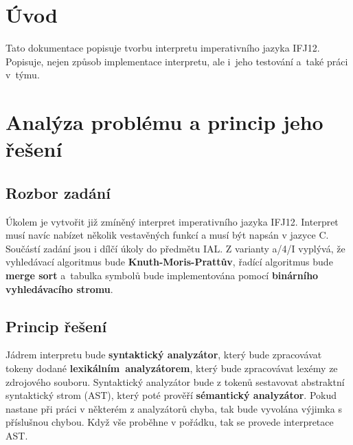 \documentclass[12pt,a4paper,titlepage,final]{article}
\begin{document}



\pagestyle{plain}
\setcounter{page}{1}
\tableofcontents

\newpage
\pagestyle{plain}
\setcounter{page}{1}

\section{Úvod} \label{uvod}
Tato dokumentace popisuje tvorbu interpretu imperativního jazyka IFJ12. 
Popisuje, nejen způsob implementace interpretu, ale i~jeho testování a~také práci v~týmu.

\section{Analýza problému a princip jeho řešení} \label{analyza}
\subsection{Rozbor zadání}
Úkolem je vytvořit již zmíněný interpret imperativního jazyka IFJ12. Interpret 
musí navíc nabízet několik vestavěných funkcí a musí být napsán v jazyce C. Součástí 
zadání jsou i dílčí úkoly do předmětu IAL. Z varianty a/4/I vyplývá, že vyhledávací 
algoritmus bude \textbf{Knuth-Moris-Prattův}, řadící algoritmus bude \textbf{merge sort} 
a~tabulka symbolů bude implementována pomocí \textbf{binárního vyhledávacího stromu}. 
\subsection{Princip řešení}
Jádrem interpretu bude \textbf{syntaktický analyzátor}, který bude zpracovávat tokeny 
dodané \mbox{\textbf{lexikálním analyzátorem}}, který bude zpracovávat lexémy ze zdrojového souboru.
Syntaktický analyzátor bude z tokenů sestavovat abstraktní syntaktický strom (AST), který poté
prověří \textbf{sémantický analyzátor}. Pokud nastane při práci v některém z analyzátorů chyba, 
tak bude vyvolána výjimka s příslušnou chybou. Když vše proběhne v pořádku, tak se provede 
interpretace AST. 
                                              
\end{document}
